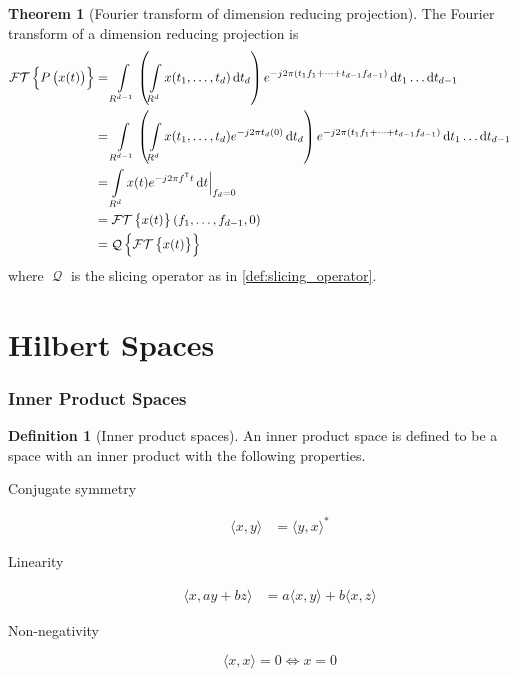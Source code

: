 \documentclass[titlepage, fleqn, a4paper, 12pt, twoside]{article}
\theoremstyle{definition}
\newtheorem{definition}{Definition}
\theoremstyle{theorem}
\newtheorem{theorem}{Theorem}
\DeclareMathOperator{\FT}{\mathcal{FT}}
\DeclareMathOperator{\Q}{\mathcal{Q}}
\def\transpose#1{{#1}^{\mathsf{T}}}
\begin{document}
\begin{theorem}[Fourier transform of dimension reducing projection]
	The Fourier transform of a dimension reducing projection is
	\begin{align*}
		\FT\left\{ P\left( x(t) \right) \right\} &= \int\limits_{R^{d - 1}} \left( \int\limits_{R^d} x(t_1,\dots,t_d) \dif t_d \right) e^{-j 2 \pi (t_1 f_1 + \dots + t_{d - 1} f_{d - 1})} \dif t_1 \dots \dif t_{d - 1}\\
		&= \int\limits_{R^{d - 1}} \left( \int\limits_{R^d} x(t_1,\dots,t_d) e^{-j 2 \pi t_d (0)} \dif t_d \right) e^{-j 2 \pi (t_1 f_1 + \dots + t_{d - 1} f_{d - 1})} \dif t_1 \dots \dif t_{d - 1}\\
		&= \int\limits_{R^d} x(t) e^{-j 2 \pi \transpose{f} t} \dif t \Big|_{f_d = 0}\\
		&= \FT\left\{ x(t) \right\}(f_1,\dots,f_{d - 1},0)\\
		&= \Q\left\{ \FT\left\{ x(t) \right\} \right\}
	\end{align*}
	where $\Q$ is the slicing operator as in \cref{def:slicing_operator}.
	\label{thm:Fourier_transform_of_dimension_reducing_projection}
\end{theorem}

\clearpage
\part{Hilbert Spaces}

\section{Inner Product Spaces}

\begin{definition}[Inner product spaces]
	An inner product space is defined to be a space with an inner product with the following properties.
	\begin{description}
		\item[Conjugate symmetry]
			\begin{align*}
				\langle x,y \rangle &= \langle y,x \rangle^*
			\end{align*}
		\item[Linearity]
			\begin{align*}
				\langle x , a y + b z \rangle &= a \langle x,y \rangle + b \langle x,z \rangle
			\end{align*}
		\item[Non-negativity]
			\begin{equation*}
				\langle x,x \rangle = 0 \iff x = 0
			\end{equation*}
	\end{description}
\end{definition}
\end{document}
